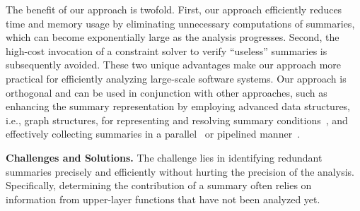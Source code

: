 The benefit of our approach is twofold. 
First, our approach efficiently reduces time and memory usage by eliminating unnecessary computations of summaries, which can become exponentially large as the analysis progresses.
Second, the high-cost invocation of a constraint solver to verify ``useless'' summaries is subsequently avoided.
These two unique advantages make our approach more practical for efficiently analyzing large-scale software systems.
Our approach is orthogonal and can be used in conjunction with other approaches, 
such as enhancing the summary representation 
by employing advanced data structures, i.e., graph structures, for representing and resolving summary conditions~\cite{shi2021path}, and effectively collecting summaries
in a parallel~\cite{tang2023Scaling} or pipelined manner~\cite{shi2020pipelining}. 






\textbf{Challenges and Solutions.} 
The challenge lies in identifying redundant summaries precisely and efficiently without hurting the precision of the analysis.
Specifically, determining the contribution of a summary often relies on information from upper-layer functions that have not been analyzed yet. 


